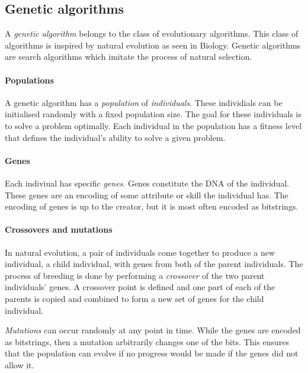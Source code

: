 \label{sec:preliminaries}

\subsection{Genetic algorithms}

A \emph{genetic algorithm} belongs to the class of evolutionary algorithms.
This class of algorithms is inspired by natural evolution as seen in Biology.
Genetic algorithms are search algorithms which imitate the process of natural selection.

\paragraph{Populations}

A genetic algorithm has a \emph{population} of \emph{individuals}.
These individials can be initialised randomly with a fixed population size.
The goal for these individuals is to solve a problem optimally.
Each individual in the population has a fitness level that defines the individual's ability to solve a given problem.

\paragraph{Genes}

Each indiviual has specific \emph{genes}.
Genes constitute the DNA of the individual.
These genes are an encoding of some attribute or skill the individual has.
The encoding of genes is up to the creator, but it is most often encoded as bitstrings.

\paragraph{Crossovers and mutations}

In natural evolution, a pair of individuals come together to produce a new individual, a child individual, with genes from both of the parent individuals.
The process of breeding is done by performing a \emph{crossover} of the two parent individuals' genes.
A crossover point is defined and one part of each of the parents is copied and combined to form a new set of genes for the child individual.


\emph{Mutations} can occur randomly at any point in time.
While the genes are encoded as bitstrings, then a mutation arbitrarily changes one of the bits.
This ensures that the population can evolve if no progress would be made if the genes did not allow it.

